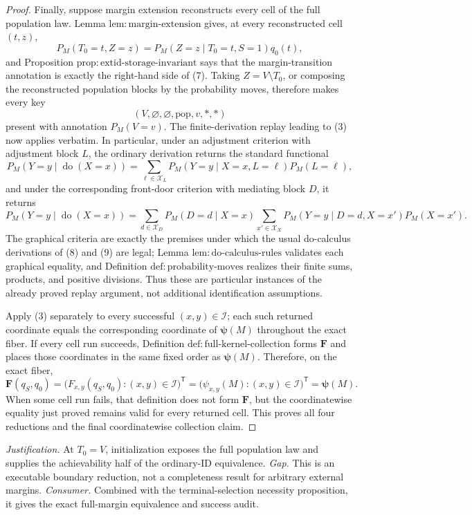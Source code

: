 \documentclass{article}
\begin{document}
\begin{proof}
Finally, suppose margin extension reconstructs every cell of the full population law.  Lemma \(\mathrm{lem{:}margin\text{-}extension}\) gives, at every reconstructed cell \((t,z)\),
\[
P_M(T_0=t,Z=z)
=P_M(Z=z\mid T_0=t,S=1)q_0(t), \tag{7}
\]
and Proposition \(\mathrm{prop{:}extid\text{-}storage\text{-}invariant}\) says that the margin-transition annotation is exactly the right-hand side of (7).  Taking \(Z=V\setminus T_0\), or composing the reconstructed population blocks by the probability moves, therefore makes every key
\[
(V,\varnothing,\varnothing,\mathrm{pop},v,\ast,\ast)
\]
present with annotation \(P_M(V=v)\).  The finite-derivation replay leading to (3) now applies verbatim.  In particular, under an adjustment criterion with adjustment block \(L\), the ordinary derivation returns the standard functional
\[
P_M(Y=y\mid\operatorname{do}(X=x))
=\sum_{\ell\in\mathcal X_L}P_M(Y=y\mid X=x,L=\ell)P_M(L=\ell), \tag{8}
\]
and under the corresponding front-door criterion with mediating block \(D\), it returns
\[
P_M(Y=y\mid\operatorname{do}(X=x))
=\sum_{d\in\mathcal X_D}P_M(D=d\mid X=x)
  \sum_{x'\in\mathcal X_X}P_M(Y=y\mid D=d,X=x')P_M(X=x'). \tag{9}
\]
The graphical criteria are exactly the premises under which the usual do-calculus derivations of (8) and (9) are legal; Lemma \(\mathrm{lem{:}do\text{-}calculus\text{-}rules}\) validates each graphical equality, and Definition \(\mathrm{def{:}probability\text{-}moves}\) realizes their finite sums, products, and positive divisions.  Thus these are particular instances of the already proved replay argument, not additional identification assumptions.

Apply (3) separately to every successful \((x,y)\in\mathcal I\); each such returned coordinate equals the corresponding coordinate of \(\boldsymbol\psi(M)\) throughout the exact fiber.  If every cell run succeeds, Definition \(\mathrm{def{:}full\text{-}kernel\text{-}collection}\) forms \(\mathbf F\) and places those coordinates in the same fixed order as \(\boldsymbol\psi(M)\).  Therefore, on the exact fiber,
\[
\mathbf F(q_S,q_0)
=\bigl(F_{x,y}(q_S,q_0):(x,y)\in\mathcal I\bigr)^{\mathsf T}
=\bigl(\psi_{x,y}(M):(x,y)\in\mathcal I\bigr)^{\mathsf T}
=\boldsymbol\psi(M).
\]
When some cell run fails, that definition does not form \(\mathbf F\), but the coordinatewise equality just proved remains valid for every returned cell.  This proves all four reductions and the final coordinatewise collection claim.
\end{proof}
\par\smallskip\noindent \textit{Justification.} At \(T_0=V\), initialization exposes the full population law and supplies the achievability half of the ordinary-ID equivalence. \textit{Gap.} This is an executable boundary reduction, not a completeness result for arbitrary external margins. \textit{Consumer.} Combined with the terminal-selection necessity proposition, it gives the exact full-margin equivalence and success audit.
\end{document}
